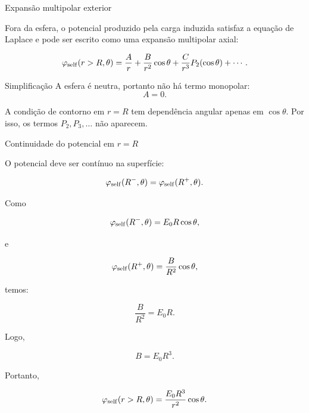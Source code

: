 \documentclass[aspectratio=169]{beamer}
\begin{document}
\begin{frame}{Expansão multipolar exterior}

\small

Fora da esfera, o potencial produzido pela carga induzida satisfaz a equação de
Laplace e pode ser escrito como uma expansão multipolar axial:

\begin{eqbox}
\begin{equation}
\varphi_{\rm self}(r>R,\theta)
=
\frac{A}{r}
+
\frac{B}{r^2}\cos\theta
+
\frac{C}{r^3}P_2(\cos\theta)
+\cdots .
\label{eq:expansao-self}
\end{equation}
\end{eqbox}

\begin{mybox}{Simplificação}
A esfera é neutra, portanto não há termo monopolar:
\[
A=0.
\]

A condição de contorno em \(r=R\) tem dependência angular apenas em
\(\cos\theta\). Por isso, os termos \(P_2,P_3,\ldots\) não aparecem.
\end{mybox}

\end{frame}

\begin{frame}{Continuidade do potencial em \(r=R\)}

\small

O potencial deve ser contínuo na superfície:

\[
\varphi_{\rm self}(R^-,\theta)
=
\varphi_{\rm self}(R^+,\theta).
\]

Como

\[
\varphi_{\rm self}(R^-,\theta)=E_0R\cos\theta,
\]

e

\[
\varphi_{\rm self}(R^+,\theta)=\frac{B}{R^2}\cos\theta,
\]

temos:

\[
\frac{B}{R^2}=E_0R.
\]

Logo,

\[
B=E_0R^3.
\]

Portanto,

\begin{eqbox}
\begin{equation}
\varphi_{\rm self}(r>R,\theta)
=
\frac{E_0R^3}{r^2}\cos\theta.
\label{eq:self-exterior-esfera}
\end{equation}
\end{eqbox}

\end{frame}
\end{document}
